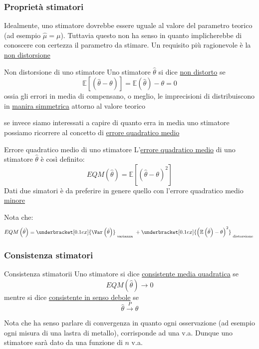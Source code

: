 \subsubsection*{Proprietà stimatori}
Idealmente, uno stimatore dovrebbe essere uguale al valore del parametro teorico (ad esempio $ \hat{\mu } = \mu  $). Tuttavia questo non ha senso in quanto implicherebbe di conoscere con certezza il parametro da stimare. Un requisito più ragionevole è la \underline{non distorsione}
\begin{definizione}{Non distorsione di uno stimatore}
	Uno stimatore $ \hat{\theta } $ si dice \underline{non distorto} se
	\[
		\mathbb{E}\left[\left(\hat{ \theta } - \theta \right)\right] = \mathbb{E} \left(\hat{\theta }\right) - \theta = 0
	\]
	ossia gli errori in media di compensano, o meglio, le imprecisioni di distribuiscono in \underline{manira simmetrica} attorno al valore teorico
\end{definizione}
se invece siamo interessati a capire di quanto erra in media uno stimatore possiamo ricorrere al concetto di \underline{errore quadratico medio}
\begin{definizione}{Errore quadratico medio di uno stimatore}
	L'\underline{errore quadratico medio} di uno stimatore $ \hat{\theta } $ è così definito:
	\[
		EQM\left(\hat{\theta }\right) = \mathbb{E}\left[\left(\hat{ \theta } - \theta  \right)^2 \right]
	\]
	Dati due simatori è da preferire in genere quello con l'errore quadratico medio \underline{minore}
\end{definizione}
Nota che:
\[
	EQM\left(\hat{\theta }\right) = \underbracket[0.1ex]{\Var \left(\hat{ \theta }\right)}_{\text{ varianza }} + \underbracket[0.1ex]{\left(\mathbb{E}\left(\hat{\theta }  \right)- \theta\right)^2}_{\text{ distorsione }}
\]
\subsubsection*{Consistenza stimatori}
\begin{definizione}{Consistenza stimatorii}
	Uno stimatore si dice \underline{consistente media quadratica} se
	\[
		EQM \left(\hat{\theta }\right) \to 0
	\]
	mentre si dice \underline{consistente in senso debole} se
	\[
		\hat{ \theta } \xrightarrow{P}  \theta
	\]
\end{definizione}
Nota che ha senso parlare di convergenza in quanto ogni osservazione (ad esempio ogni misura di una lastra di metallo), corrisponde ad una v.a. Dunque uno stimatore sarà dato da una funzione di $ n $ v.a.
